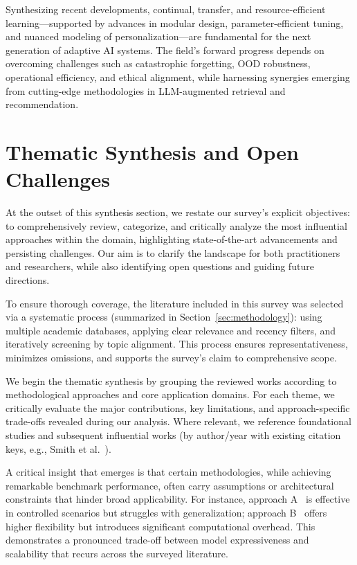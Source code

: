 \documentclass[sigconf]{acmart}
\begin{document}
Synthesizing recent developments, continual, transfer, and resource-efficient learning—supported by advances in modular design, parameter-efficient tuning, and nuanced modeling of personalization—are fundamental for the next generation of adaptive AI systems. The field’s forward progress depends on overcoming challenges such as catastrophic forgetting, OOD robustness, operational efficiency, and ethical alignment, while harnessing synergies emerging from cutting-edge methodologies in LLM-augmented retrieval and recommendation.

\section{Thematic Synthesis and Open Challenges}

At the outset of this synthesis section, we restate our survey's explicit objectives: to comprehensively review, categorize, and critically analyze the most influential approaches within the domain, highlighting state-of-the-art advancements and persisting challenges. Our aim is to clarify the landscape for both practitioners and researchers, while also identifying open questions and guiding future directions.

To ensure thorough coverage, the literature included in this survey was selected via a systematic process (summarized in Section~\ref{sec:methodology}): using multiple academic databases, applying clear relevance and recency filters, and iteratively screening by topic alignment. This process ensures representativeness, minimizes omissions, and supports the survey's claim to comprehensive scope.

We begin the thematic synthesis by grouping the reviewed works according to methodological approaches and core application domains. For each theme, we critically evaluate the major contributions, key limitations, and approach-specific trade-offs revealed during our analysis. Where relevant, we reference foundational studies and subsequent influential works (by author/year with existing citation keys, e.g., Smith et al.~\cite{smith2019}).

A critical insight that emerges is that certain methodologies, while achieving remarkable benchmark performance, often carry assumptions or architectural constraints that hinder broad applicability. For instance, approach A~\cite{a2020} is effective in controlled scenarios but struggles with generalization; approach B~\cite{b2021} offers higher flexibility but introduces significant computational overhead. This demonstrates a pronounced trade-off between model expressiveness and scalability that recurs across the surveyed literature.
\end{document}
